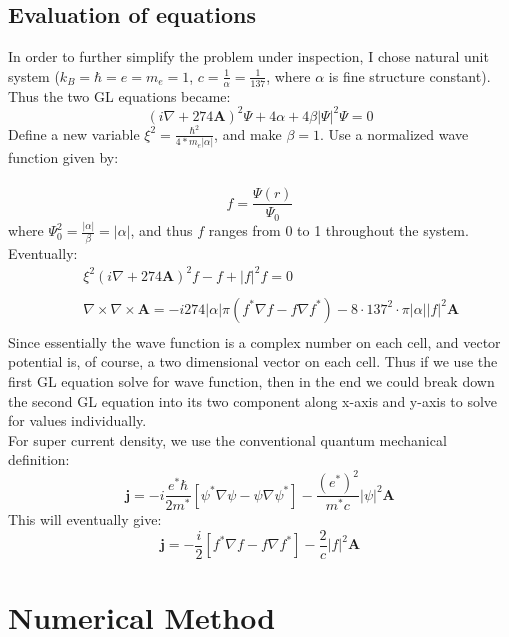 \documentclass[11pt]{article}
\newcommand{\bqs}{\begin{eqnarray*}}
\newcommand{\eqs}{\end{eqnarray*}}
\renewcommand{\vec}[1]{\mathbf{#1}}
\begin{document}
\subsection{Evaluation of equations}
In order to further simplify the problem under inspection, I chose natural unit system ($k_B=\hbar=e=m_e=1$, $c=\frac{1}{\alpha}=\frac{1}{137}$, where $\alpha$ is fine structure constant). Thus the two GL equations became:\\
$$
(i\nabla+274\vec{A})^2\Psi+4\alpha+4\beta|\Psi|^2\Psi=0
$$
Define a new variable $\xi^2=\frac{\hbar^2}{4*m_e|\alpha|}$, and make $\beta=1$. Use a normalized wave function given by:\\
\\
$$
f=\frac{\Psi(r)}{\Psi_0}
$$
where $\Psi_0^2=\frac{|\alpha|}{\beta}=|\alpha|$, and thus $f$ ranges from 0 to 1 throughout the system. Eventually:\\
\bqs
&&\xi^2(i\nabla+274\vec{A})^2f-f+|f|^2f=0\\
\\
&&\nabla\times\nabla\times\vec{A}=-i274|\alpha|\pi(f^*\nabla f-f\nabla f^*)-8\cdot137^2\cdot \pi|\alpha||f|^2\vec{A}\\
\eqs
Since essentially the wave function is a complex number on each cell, and vector potential is, of course, a two dimensional vector on each cell. Thus if we use the first GL equation solve for wave function, then in the end we could break down the second GL equation into its two component along x-axis and y-axis to solve for values individually.\\
For super current density, we use the conventional quantum mechanical definition:\\
$$
\vec{j}=-i\frac{e^*\hbar}{2m^*}[\psi^*\nabla\psi-\psi\nabla\psi^*]-\frac{(e^*)^2}{m^*c}|\psi|^2\vec{A}
$$
This will eventually give:\\
$$
\vec{j}=-\frac{i}{2}[f^*\nabla f-f\nabla f^*]-\frac{2}{c}|f|^2\vec{A}
$$



\section{\label{SECT:NumericalMethod} Numerical Method}
\end{document}
